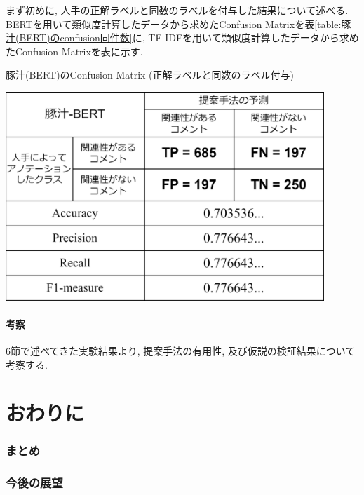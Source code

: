 \documentclass{ltjarticle}
\begin{document}
まず初めに, 人手の正解ラベルと同数のラベルを付与した結果について述べる. 
BERTを用いて類似度計算したデータから求めたConfusion Matrixを表\ref{table:豚汁(BERT)のconfusion同件数}に, 
TF-IDFを用いて類似度計算したデータから求めたConfusion Matrixを表に示す. 
\vspace{10truept}

\begin{table}[ht]
    \centering
    \caption{豚汁(BERT)のConfusion Matrix (正解ラベルと同数のラベル付与)}
    \vspace{5truept}

    \includegraphics[width = 12cm]{images/豚汁images/豚汁Confusion_BERT同件数.drawio.png}
    \label{table:豚汁(BERT)のconfusion同件数}
\end{table}









\newpage
\subsection{考察}
6節で述べてきた実験結果より, 提案手法の有用性, 及び仮説の検証結果について考察する. 




\newpage
\part{おわりに}
\section{まとめ}
\section{今後の展望}
\end{document}
